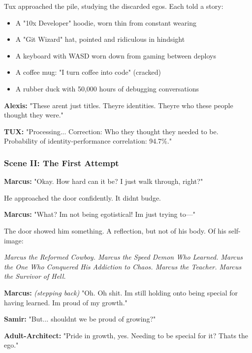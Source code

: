 Tux approached the pile, studying the discarded egos. Each told a story:

\begin{itemize}
\tightlist
\item
  A "10x Developer" hoodie, worn thin from constant wearing
\item
  A "Git Wizard" hat, pointed and ridiculous in hindsight
\item
  A keyboard with WASD worn down from gaming between deploys
\item
  A coffee mug: "I turn coffee into code" (cracked)
\item
  A rubber duck with 50,000 hours of debugging conversations
\end{itemize}

\textbf{Alexis:} "These aren\textquotesingle t just titles. They\textquotesingle re identities. They\textquotesingle re who these people thought they were."

\textbf{TUX:} "Processing... Correction: Who they thought they needed to be. Probability of identity-performance correlation: 94.7\%."

\bookdivider

\subsubsection{Scene II: The First Attempt}\label{scene-ii-the-first-attempt}

\textbf{Marcus:} "Okay. How hard can it be? I just walk through, right?"

He approached the door confidently. It didn\textquotesingle t budge.

\textbf{Marcus:} "What? I\textquotesingle m not being egotistical! I\textquotesingle m just trying to---"

The door showed him something. A reflection, but not of his body. Of his self-image:

\emph{Marcus the Reformed Cowboy. Marcus the Speed Demon Who Learned. Marcus the One Who Conquered His Addiction to Chaos. Marcus the Teacher. Marcus the Survivor of Hell.}

\textbf{Marcus:} \emph{(stepping back)} "Oh. Oh shit. I\textquotesingle m still holding onto being special for having learned. I\textquotesingle m proud of my growth."

\textbf{Samir:} "But... shouldn\textquotesingle t we be proud of growing?"

\textbf{Adult-Architect:} "Pride in growth, yes. Needing to be special for it? That\textquotesingle s the ego."

